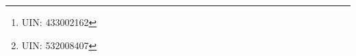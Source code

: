 %


\author{
  Shao-Ting Chiu\thanks{UIN: 433002162} \\
  Department of Electrical and Computer Engineering\\
  Texas A\&M University\\
  College Station, TX 77843 \\
  \texttt{stchiu@tamu.edu} \\
  \AND
  Chan-Min Hsu\thanks{UIN: 532008407} \\
  Department of Electrical and Computer Engineering\\
  Texas A\&M University\\
  College Station, TX 77843 \\
  \texttt{chanminhsu@tamu.edu} \\
}